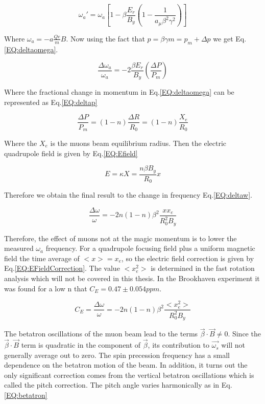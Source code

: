 \documentclass[./Thesis]{subfiles}
\begin{document}
	\begin{equation}
	\omega_{a}' = \omega_{a}[1-\beta\frac{E_r}{B_y}(1-\frac{1}{a_\mu \beta^2 \gamma^2})]
	\end{equation}

Where $\omega_{a} = -a \frac{Qe}{m}B$. Now using the fact that $p=\beta\gamma m = p_m + \Delta p$ we get Eq.\ref{EQ:deltaomega}.


\begin{equation}
\label{EQ:deltaomega}
\frac{\Delta \omega_a}{\omega_a} = -2 \frac{\beta E_r}{B_y}(\frac{\Delta P}{P_m})
\end{equation}

Where the fractional change in momentum in Eq.\ref{EQ:deltaomega} can be represented as Eq.\ref{EQ:deltap}

\begin{equation}
\label{EQ:deltap}
\frac{\Delta P}{P_m}=(1-n)\frac{\Delta R}{R_0} = (1-n) \frac{X_e}{R_0}
\end{equation}


Where the $X_e$ is the muons beam equilibrium radius. Then the electric quadrupole field is given by Eq.\ref{EQ:Efield}

\begin{equation}
\label{EQ:Efield}
E = \kappa X = \frac{n\beta B_y}{R_{0}}x
\end{equation}

Therefore we obtain the final result to the change in frequency Eq.\ref{EQ:deltaw}.

\begin{equation}
\label{EQ:deltaw}
\frac{\Delta \omega}{\omega} = -2n(1-n)\beta^2\frac{x x_e}{R_0^2 B_y}
\end{equation}

Therefore, the effect of muons not at the magic momentum is to lower the measured $\omega_a$ frequency.  For a quadrupole focusing field plus a uniform magnetic field the time average of $<x> = x_e$, so the electric field correction is given by Eq.\ref{EQ:EFieldCorrection}. The value $<x_e^2>$ is determined in the fast rotation analysis which will not be covered in this thesis.  In the Brookhaven experiment it was found for a low n that $C_E = 0.47 \pm 0.054 ppm$.

\begin{equation}
\label{EQ:EFieldCorrection}
C_E = \frac{\Delta\omega}{\omega} = -2n(1-n)\beta^2\frac{<x_e^2>}{R_0^2 B_y}
\end{equation}

The betatron oscillations of the muon beam lead to the terms $\vec{\beta}\cdot\vec{B}\neq0$. Since the $\vec{\beta}\cdot\vec{B}$ term is quadratic in the component of $\vec{\beta}$, its contribution to $\vec{\omega_s}$ will not generally average out to zero. The spin precession frequency has a small dependence on the betatron motion of the beam. In addition, it turns out the only significant correction comes from the vertical betatron oscillations which is called the pitch correction. The pitch angle varies harmonically as in Eq.\ref{EQ:betatron}
\end{document}
